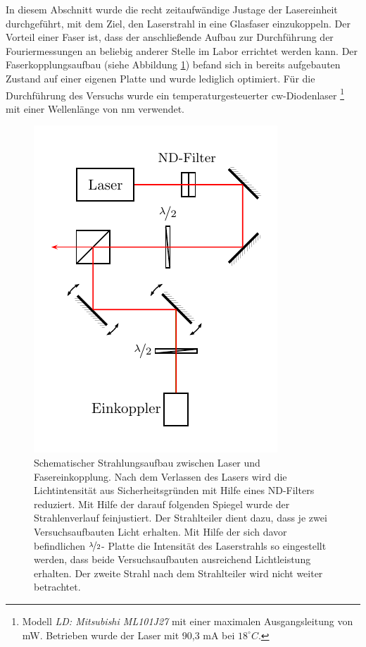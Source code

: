 
In diesem Abschnitt wurde die recht zeitaufwändige Justage der Lasereinheit durchgeführt, mit dem Ziel, den Laserstrahl in eine Glasfaser einzukoppeln. Der Vorteil einer Faser ist, dass der anschließende Aufbau zur Durchführung der Fouriermessungen an beliebig anderer Stelle im Labor errichtet werden kann. 
Der Faserkopplungsaufbau (siehe Abbildung \ref{fig:lasereinheit}) befand sich in bereits aufgebauten Zustand auf einer eigenen Platte und wurde lediglich optimiert. Für die Durchführung des Versuchs wurde ein temperaturgesteuerter cw-Diodenlaser \footnote{Modell  \textit{LD: Mitsubishi ML101J27} mit einer maximalen Ausgangsleitung von \unit[35]{mW}. Betrieben wurde der Laser mit 90,3 mA bei $18^\circ C$.} mit einer Wellenlänge von \unit[660]{nm} verwendet.

\begin{figure}[h]
	\centering
	\includegraphics[width=0.5\linewidth]{graphs/versuchsaufbau/lasereinheit.pdf}
	\caption[Schematischer Aufbau Lasereinheit]{
		Schematischer Strahlungsaufbau zwischen Laser und Fasereinkopplung. Nach dem Verlassen des Lasers wird die Lichtintensität aus Sicherheitsgründen mit Hilfe eines ND-Filters reduziert. Mit Hilfe der darauf folgenden Spiegel wurde der Strahlenverlauf feinjustiert. Der Strahlteiler dient dazu, dass je zwei Versuchsaufbauten Licht erhalten. Mit Hilfe der sich davor befindlichen $\nicefrac{\lambda}{2}$- Platte die Intensität des Laserstrahls so eingestellt werden, dass beide Versuchsaufbauten ausreichend Lichtleistung erhalten. Der zweite Strahl nach dem Strahlteiler wird nicht weiter betrachtet.
	}
	\label{fig:lasereinheit}
\end{figure}

